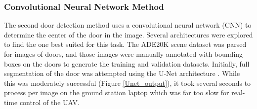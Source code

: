 \documentclass[12pt]{article}
\begin{document}
\subsubsection{Convolutional Neural Network Method}
The second door detection method uses a convolutional neural network (CNN) to determine the center of the door in the image. Several architectures were explored to find the one best suited for this task. The ADE20K scene dataset\cite{csail_data_1} was parsed for images of doors, and those images were manually annotated with bounding boxes on the doors to generate the training and validation datasets. Initially, full segmentation of the door was attempted using the U-Net architecture \cite{Unet}. While this was moderately successful (Figure \ref{Unet_output}), it took several seconds to process per image on the ground station laptop which was far too slow for real-time control of the UAV.
\end{document}

